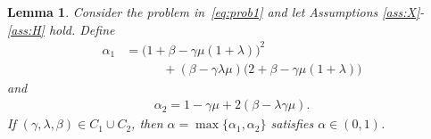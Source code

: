 \documentclass[9pt,shortpaper,twoside,web]{ieeecolor}
\newtheorem{lemma}{Lemma}
\begin{document}
    \begin{lemma}\label{lem:alphabound}
        Consider the problem in~\eqref{eq:prob1} and let Assumptions \ref{ass:X}-\ref{ass:H} hold.
        Define
        \begin{align}\label{eq:alpha1}
        \alpha_1&= \big(1+\beta-\gamma\mu(1+\lambda)\big)^2 
        \\ &\quad\quad\quad + (\beta-\gamma\lambda \mu)\big(2+\beta-\gamma\mu(1+\lambda)\big)
    \end{align}
    and
    \begin{align}\label{eq:alpha2}
        \alpha_2 = 1-\gamma\mu+2(\beta-\lambda\gamma\mu).
    \end{align}
        If $(\gamma,\lambda,\beta)\in C_1\cup C_2$, then $\alpha=\max\{\alpha_1,\alpha_2\}$ 
        satisfies $\alpha\in(0,1)$.
    \end{lemma}
\end{document}
